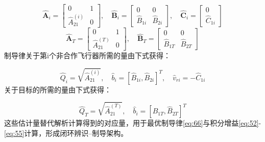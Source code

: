 \begin{equation}
\label{eq:39}
{\widehat {\mathbf{A}}_i} = \left[ {\begin{array}{*{20}{c}}
  0&1 \\ 
  {\hat A_{21}^{(i)}}&0 
\end{array}} \right],\quad {\widehat {\mathbf{B}}_i} = \left[ {\begin{array}{*{20}{c}}
  0&0 \\ 
  {{{\hat B}_{1i}}}&{{{\hat B}_{2i}}} 
\end{array}} \right],\quad {\widehat {\mathbf{C}}_i} = \left[ {\begin{array}{*{20}{c}}
  0 \\ 
  {{{\hat C}_{1i}}} 
\end{array}} \right]
\end{equation}
\begin{equation}
\label{eq:40}
{\widehat {\mathbf{A}}_T} = \left[ {\begin{array}{*{20}{c}}
  0&1 \\ 
  {\hat A_{21}^{(T)}}&0 
\end{array}} \right],\quad {\widehat {\mathbf{B}}_T} = \left[ {\begin{array}{*{20}{c}}
  0&0 \\ 
  {{{\hat B}_{1T}}}&{{{\hat B}_{2T}}} 
\end{array}} \right]
\end{equation}
制导律关于第i个非合作飞行器所需的量由下式获得：

\begin{equation}
\label{eq:41}
{\hat Q_i} = \sqrt {\hat A_{21}^{(i)}} ,\quad {\widehat b_i} = {\left[ {{{\hat B}_{1i}},{{\hat B}_{2i}}} \right]^T},\quad {\hat v_{ri}} =  - {\hat C_{1i}}
\end{equation}
关于目标的所需的量由下式获得：

\begin{equation}
\label{eq:42}
{\hat Q_T} = \sqrt {\hat A_{21}^{(T)}} ,\quad {\widehat b_i} = {\left[ {{{\hat B}_{1T}},{{\hat B}_{2T}}} \right]^T}
\end{equation}
这些估计量替代解析计算得到的对应量，用于最优制导律\eqref{eq:66}与积分增益\eqref{eq:52}-\eqref{eq:55}计算，形成闭环辨识–制导架构。

